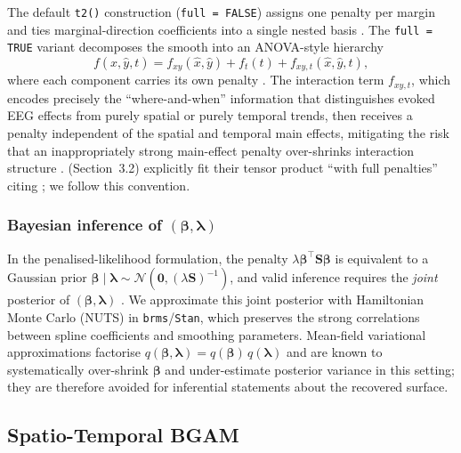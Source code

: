 \documentclass[12pt, a4paper]{article}
\begin{document}
The default \texttt{t2()} construction (\texttt{full = FALSE}) assigns one
penalty per margin and ties marginal-direction coefficients into a single
nested basis \citep{Wood2006tensor}.
The \texttt{full = TRUE} variant decomposes the smooth into an
ANOVA-style hierarchy
%
\begin{equation}\label{eq:anova}
  f(\hat{x}, \hat{y}, t)
  = f_{xy}(\hat{x}, \hat{y})
  + f_{t}(t)
  + f_{xy,t}(\hat{x}, \hat{y}, t),
\end{equation}
%
where each component carries its own penalty
\citep{WoodScheiplFaraway2013}.
The interaction term $f_{xy,t}$, which encodes precisely the
``where-and-when'' information that distinguishes evoked EEG effects from
purely spatial or purely temporal trends, then receives a penalty
independent of the spatial and temporal main effects, mitigating the risk
that an inappropriately strong main-effect penalty over-shrinks
interaction structure \citep[\S 5.6.3]{Wood2017}.
\citet{Nalborczyk2025} (Section~3.2) explicitly fit their tensor product
``with full penalties'' citing \citet{Wood2017}; we follow this convention.

\subsubsection{\texorpdfstring{Bayesian inference of $(\boldsymbol{\beta}, \boldsymbol{\lambda})$}{Bayesian inference of (beta, lambda)}}\label{sec:theory_inference}

In the penalised-likelihood formulation, the penalty $\lambda
\boldsymbol{\beta}^{\!\top}\!\mathbf{S}\boldsymbol{\beta}$ is equivalent
to a Gaussian prior
$\boldsymbol{\beta}\!\mid\!\boldsymbol{\lambda} \sim
\mathcal{N}(\mathbf{0}, (\lambda\mathbf{S})^{-1})$, and valid inference
requires the \emph{joint} posterior of $(\boldsymbol{\beta},
\boldsymbol{\lambda})$ \citep[\S 6.10--6.11]{Wood2017,MarraWood2012}.
We approximate this joint posterior with Hamiltonian Monte Carlo (NUTS)
in \texttt{brms}/\texttt{Stan}, which preserves the strong correlations
between spline coefficients and smoothing parameters.
Mean-field variational approximations factorise $q(\boldsymbol{\beta},
\boldsymbol{\lambda}) = q(\boldsymbol{\beta})\,q(\boldsymbol{\lambda})$
and are known to systematically over-shrink $\boldsymbol{\beta}$ and
under-estimate posterior variance in this setting; they are therefore
avoided for inferential statements about the recovered surface.

\subsection{Spatio-Temporal BGAM}
\end{document}
